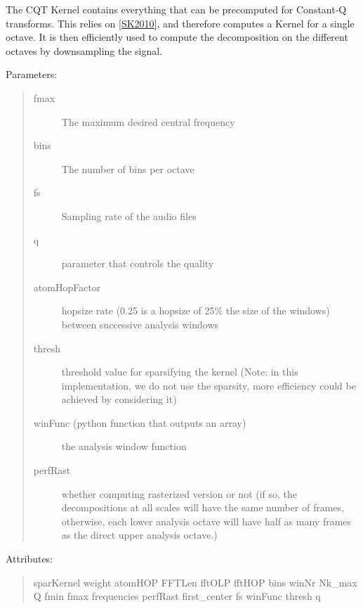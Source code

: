 \documentclass[letterpaper,10pt,english]{sphinxmanual}
\begin{document}
\begin{fulllineitems}
\label{reference/tftransforms:pyfasst.tftransforms.minqt.CQTKernel}
The CQT Kernel contains everything that can be
precomputed for Constant-Q transforms. This
relies on {\hyperref[reference/tftransforms:sk2010]{{[}SK2010{]}}}, and therefore computes a Kernel
for a single octave. It is then efficiently used to
compute the decomposition on the different octaves by
downsampling the signal.

Parameters:
\begin{quote}
\begin{description}
\item[{fmax}] \leavevmode
The maximum desired central frequency

\item[{bins}] \leavevmode
The number of bins per octave

\item[{fs}] \leavevmode
Sampling rate of the audio files

\item[{q}] \leavevmode
parameter that controls the quality

\item[{atomHopFactor}] \leavevmode
hopsize rate (0.25 is a hopsize of 25\% the size of the windows)
between successive analysis windows

\item[{thresh}] \leavevmode
threshold value for sparsifying the kernel
(Note: in this implementation, we do not use the sparsity, more
efficiency could be achieved by considering it)

\item[{winFunc (python function that outputs an array)}] \leavevmode
the analysis window function

\item[{perfRast}] \leavevmode
whether computing rasterized version or not
(if so, the decompositions at all scales will have the same
number of frames, otherwise, each lower analysis octave will have
half as many frames as the direct upper analysis octave.)

\end{description}
\end{quote}

Attributes:
\begin{quote}

sparKernel
weight
atomHOP
FFTLen
fftOLP
fftHOP
bins
winNr
Nk\_max
Q 
fmin
fmax
frequencies
perfRast
first\_center
fs 
winFunc
thresh
q
\end{quote}

\end{fulllineitems}
\end{document}
